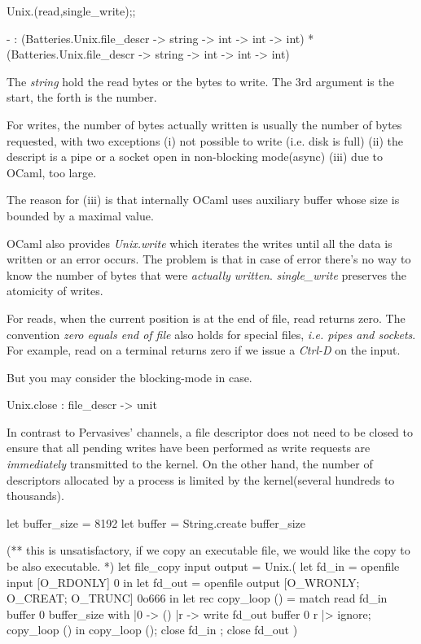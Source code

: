 \begin{enumerate}
  \begin{alternate}
    Unix.(read,single_write);;
  \end{alternate}
  \begin{bluecode}
  - : (Batteries.Unix.file_descr -> string -> int -> int -> int) *
    (Batteries.Unix.file_descr -> string -> int -> int -> int)
  \end{bluecode}    
  The \textit{string} hold the read bytes or the bytes to write. The 3rd
  argument is the start, the forth is the number.

  For writes, the number of bytes actually written is usually the
  number of bytes requested, with two exceptions
  (i) not possible to write (i.e. disk is full) (ii) the descript is a
  pipe or a socket open in non-blocking mode(async) (iii) due to
  OCaml, too large.

  The reason for (iii) is that internally OCaml uses auxiliary buffer
  whose size is bounded by a maximal value.

  OCaml also provides \textit{Unix.write} which iterates the writes
  until all the data is written or an error occurs. The problem is
  that in case of error there's no way to know the number of bytes
  that were \textit{actually written}. \textit{single\_write}
  preserves the atomicity of writes.

  For reads, when the current position is at the end of file, read
  returns zero. The convention \textit{zero equals end of file} also
  holds for special files, \textit{i.e. pipes and sockets}. For
  example, read on a terminal returns zero if we issue a
  \textit{Ctrl-D} on the input.

  But you may consider the blocking-mode in case.

  \begin{bluecode}
    Unix.close : file_descr -> unit 
  \end{bluecode}
  In contrast to Pervasives' channels, a file descriptor does not need
  to be closed to ensure that all pending writes have been performed
  as write requests are \textit{immediately} transmitted to the
  kernel. On the other hand, the number of descriptors allocated by a
  process is limited by the kernel(several hundreds to thousands).


  \begin{bluecode}
let buffer_size = 8192 
let buffer = String.create buffer_size 

(** this is unsatisfactory, if we copy an executable file, we would
like the copy to be also executable. *)
let file_copy input output = Unix.(
  let fd_in = openfile input [O_RDONLY] 0 in 
  let fd_out = openfile output [O_WRONLY; O_CREAT; O_TRUNC] 0o666 in 
  let rec copy_loop () = match read fd_in buffer 0 buffer_size with 
    |0 -> ()
    |r -> write fd_out buffer 0 r |> ignore; copy_loop () in 
  copy_loop ();
  close fd_in ; 
  close fd_out 
)



\end{bluecode}
\end{enumerate}
